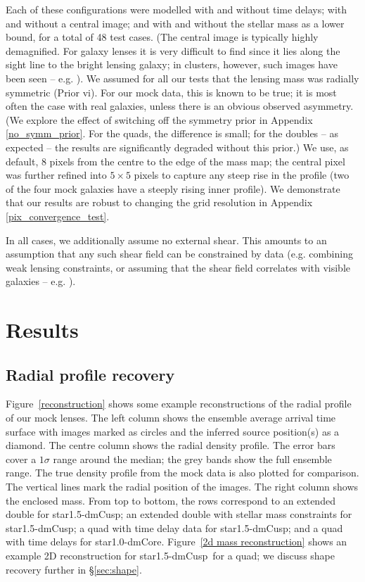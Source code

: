 \documentclass[galley,usenatbib]{mn2e}
\newcommand{\figref}[1] {Figure~\ref{#1}}
\newcommand{\mockAA}{{\sc star1.0-dmCore}}
\newcommand{\mockBC}{{\sc star1.5-dmCusp}}
\begin{document}
Each of these configurations were modelled with and without time delays; with
and without a central image; and with and without the stellar mass as a lower
bound, for a total of 48 test cases. (The central image is typically highly
demagnified. For galaxy lenses it is very difficult to find since it lies along
the sight line to the bright lensing galaxy; in clusters, however, such images
have been seen -- e.g. \citealt{2005PASJ...57L...7I}). We assumed for all our tests that the
lensing mass was radially symmetric (Prior vi). For our mock data, this is
known to be true; it is most often the case with real galaxies, unless there is
an obvious observed asymmetry. (We explore the effect of switching off the symmetry prior in Appendix \ref{no_symm_prior}. For the quads, the difference is small; for the doubles -- as expected -- the results are significantly degraded without this prior.) We use, as default, 8 pixels from the centre to the edge of the mass map; the central pixel was further refined into $5\times5$ pixels to capture any steep rise in the profile (two of the four mock galaxies have a steeply rising inner profile). We demonstrate that our results are robust to changing the grid resolution in Appendix \ref{pix_convergence_test}.

In all cases, we additionally assume no external shear. This amounts to an assumption that any such shear field can be constrained by data (e.g. combining weak lensing constraints, or assuming that the shear field correlates with visible galaxies -- e.g. \citealt{2009A&A...500..681M,2011ApJ...726...84W}).

\section{Results}\label{sec:results}

\subsection{Radial profile recovery}

\figref{reconstruction} shows some example reconstructions of the radial profile of our mock lenses. The left
column shows the ensemble average arrival time surface with images marked as
circles and the inferred source position(s) as a diamond. The centre column shows
the radial density profile. The error bars cover a $1\sigma$ range around the
median; the grey bands show the full ensemble range. The true density profile from the mock data is also plotted for
comparison. The vertical lines mark the radial position of the images. The
right column shows the enclosed mass. From top to bottom, the rows correspond
to an extended double for \mockBC; an extended double with stellar mass
constraints for \mockBC; a quad with time delay data for \mockBC; and a quad
with time delays for \mockAA. \figref{2d mass reconstruction} shows an example
2D reconstruction for \mockBC\ for a quad; we discuss shape recovery further in
\S\ref{sec:shape}.
\end{document}
